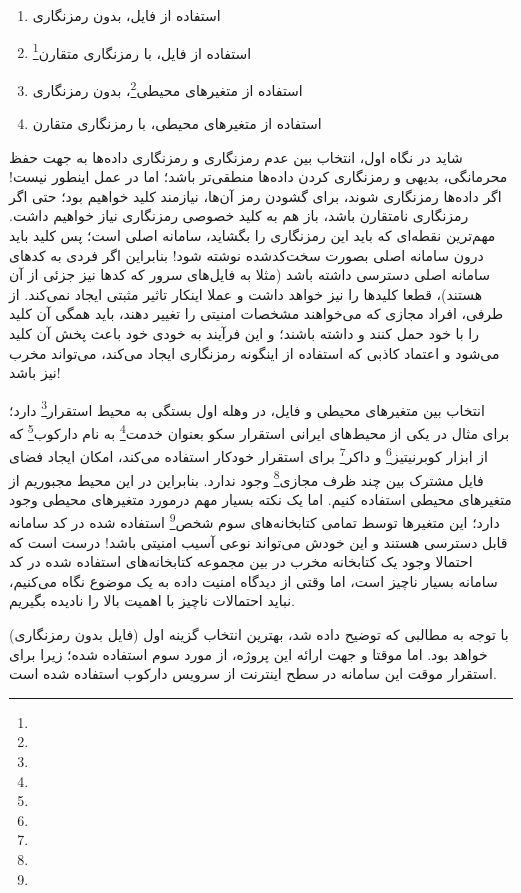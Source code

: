 \begin{enumerate}
	\item استفاده از فایل، بدون رمزنگاری
	\item استفاده از فایل، با رمزنگاری متقارن\footnote{}
	\item استفاده از متغیرهای محیطی\footnote{}، بدون رمزنگاری
	\item استفاده از متغیرهای محیطی، با رمزنگاری متقارن
\end{enumerate}

شاید در نگاه اول، انتخاب بین عدم رمزنگاری و رمزنگاری داده‌ها به جهت حفظ محرمانگی، بدیهی و رمزنگاری کردن داده‌ها منطقی‌تر باشد؛ اما در عمل اینطور نیست! اگر داده‌ها رمزنگاری شوند، برای گشودن رمز آن‌ها، نیازمند کلید خواهیم بود؛ حتی اگر رمزنگاری نامتقارن باشد، باز هم به کلید خصوصی رمزنگاری نیاز خواهیم داشت. مهم‌ترین نقطه‌ای که باید این رمزنگاری را بگشاید، سامانه اصلی است؛ پس کلید باید درون سامانه اصلی بصورت سخت‌کدشده نوشته شود! بنابراین اگر فردی به کدهای سامانه اصلی دسترسی داشته باشد (مثلا به فایل‌های سرور که کدها نیز جزئی از آن هستند)، قطعا کلیدها را نیز خواهد داشت و عملا اینکار تاثیر مثبتی ایجاد نمی‌کند. از طرفی، افراد مجازی که می‌خواهند مشخصات امنیتی را تغییر دهند،‌ باید همگی آن کلید را با خود حمل کنند و داشته باشند؛ و این فرآیند به خودی خود باعث پخش آن کلید می‌شود و اعتماد کاذبی که استفاده از اینگونه رمزنگاری ایجاد می‌کند، می‌تواند مخرب نیز باشد!

انتخاب بین متغیرهای محیطی و فایل، در وهله اول بستگی به محیط استقرار\footnote{} دارد؛ برای مثال در یکی از محیط‌های ایرانی استقرار سکو بعنوان خدمت\footnote{} به نام دارکوب\footnote{}\cite{darkube} که از ابزار کوبرنیتیز\footnote{} و داکر\footnote{} برای استقرار خودکار استفاده می‌کند، امکان ایجاد فضای فایل مشترک بین چند ظرف مجازی\footnote{} وجود ندارد. بنابراین در این محیط مجبوریم از متغیرهای محیطی استفاده کنیم. اما یک نکته بسیار مهم درمورد متغیرهای محیطی وجود دارد؛ این متغیرها توسط تمامی کتابخانه‌های سوم شخص\footnote{} استفاده شده در کد سامانه قابل دسترسی هستند و این خودش می‌تواند نوعی آسیب امنیتی باشد! درست است که احتمالا وجود یک کتابخانه مخرب در بین مجموعه کتابخانه‌های استفاده شده در کد سامانه بسیار ناچیز است، اما وقتی از دیدگاه امنیت داده به یک موضوع نگاه می‌کنیم، نباید احتمالات ناچیز با اهمیت بالا را نادیده بگیریم.

با توجه به مطالبی که توضیح داده شد، بهترین انتخاب گزینه اول (فایل بدون رمزنگاری) خواهد بود. اما موقتا و جهت ارائه این پروژه، از مورد سوم استفاده شده؛ زیرا برای استقرار موقت این سامانه در سطح اینترنت از سرویس دارکوب استفاده شده است.

